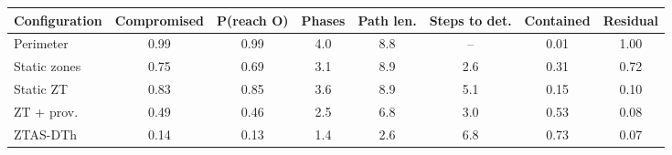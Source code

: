 \begin{tabular}{@{}lccccccc@{}}
\toprule
Configuration & Compromised & P(reach O) & Phases & Path len. & Steps to det. & Contained & Residual \\
\midrule
Perimeter & 0.99 & 0.99 & 4.0 & 8.8 & -- & 0.01 & 1.00 \\
Static zones & 0.75 & 0.69 & 3.1 & 8.9 & 2.6 & 0.31 & 0.72 \\
Static ZT & 0.83 & 0.85 & 3.6 & 8.9 & 5.1 & 0.15 & 0.10 \\
ZT + prov. & 0.49 & 0.46 & 2.5 & 6.8 & 3.0 & 0.53 & 0.08 \\
ZTAS-DTh & 0.14 & 0.13 & 1.4 & 2.6 & 6.8 & 0.73 & 0.07 \\
\bottomrule
\end{tabular}
